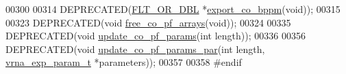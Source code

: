 \begin{DoxyCode}
00300 
00314 DEPRECATED(\hyperlink{group__data__structures_ga31125aeace516926bf7f251f759b6126}{FLT\_OR\_DBL} *\hyperlink{part__func__co_8h_ad94c0133157bed6912fe7fe866e0039e}{export\_co\_bppm}(\textcolor{keywordtype}{void}));
00315 
00323 DEPRECATED(\textcolor{keywordtype}{void} \hyperlink{part__func__co_8h_ade3ce34ae8214811374b1d28a40dc247}{free\_co\_pf\_arrays}(\textcolor{keywordtype}{void}));
00324 
00335 DEPRECATED(\textcolor{keywordtype}{void} \hyperlink{part__func__co_8h_a6e0f36c1f9b7d9dd4bfbad914c1119e5}{update\_co\_pf\_params}(\textcolor{keywordtype}{int} length));
00336 
00356 DEPRECATED(\textcolor{keywordtype}{void} \hyperlink{part__func__co_8h_a75465d7e8793db68a434d83df9a2e794}{update\_co\_pf\_params\_par}(\textcolor{keywordtype}{int} length, 
      \hyperlink{group__energy__parameters_structvrna__exp__param__s}{vrna\_exp\_param\_t} *parameters));
00357 
00358 \textcolor{preprocessor}{#endif}
\end{DoxyCode}
